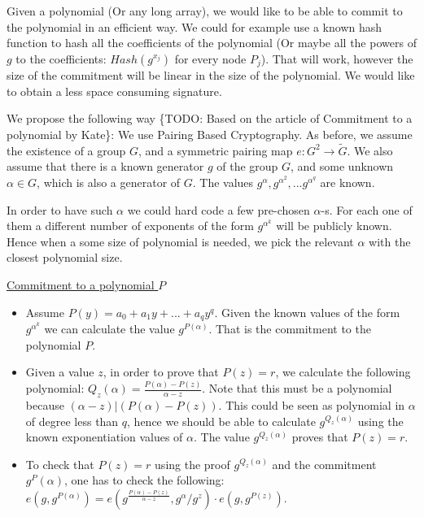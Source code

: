 Given a polynomial (Or any long array), we would like to be able to commit to
the polynomial in an efficient way. We could for example use a known hash
function to hash all the coefficients of the polynomial (Or maybe all the powers
of $g$ to the coefficients: $Hash(g^{x_j})$ for every node $P_j$). That will
work, however the size of the commitment will be linear in the size of the
polynomial. We would like to obtain a less space consuming signature.

We propose the following way \{TODO: Based on the article of Commitment to a
polynomial by Kate\}: We use Pairing Based Cryptography. As before, we assume
the existence of a group $G$, and a symmetric pairing map $e:G^2 \to \tilde{G}$.
We also assume that there is a known generator $g$ of the group $G$, and some
unknown $\alpha \in G$, which is also a generator of $G$. The values
$g^{\alpha}, g^{{\alpha}^2},...g^{{\alpha}^q}$ are known.

In order to have such $\alpha$ we could hard code a few pre-chosen $\alpha$-s.
For each one of them a different number of exponents of the form
$g^{{\alpha}^k}$ will be publicly known. Hence when a some size of polynomial is
needed, we pick the relevant $\alpha$ with the closest polynomial size.

\uline{Commitment to a polynomial $P$}
\begin{itemize}
  \item Assume $P(y) = a_0 + {a_1}y + ... + {a_q}y^q$. Given the known values of
    the form $g^{{\alpha}^k}$ we can calculate the value $g^{P(\alpha)}$. That
    is the commitment to the polynomial $P$.

  \item Given a value $z$, in order to prove that $P(z) = r$, we calculate the
    following polynomial: $Q_z(\alpha) = \frac{P(\alpha) - P(z)}{\alpha - z}$.
    Note that this must be a polynomial because $(\alpha - z) | (P(\alpha) -
    P(z))$. This could be seen as polynomial in $\alpha$ of degree less than
    $q$, hence we should be able to calculate $g^{Q_z(\alpha)}$ using the known
    exponentiation values of $\alpha$. The value $g^{Q_z(\alpha)}$ proves that
    $P(z) = r$.

  \item To check that $P(z) = r$ using the proof $g^{Q_z(\alpha)}$ and the
    commitment $g^P(\alpha)$, one has to check the following:
    $e(g,g^{P(\alpha)}) = e(g^{\frac{P(\alpha) - P(z)}{\alpha - z}},g^{\alpha} /
    g^z) \cdot e(g,g^{P(z)})$.

\end{itemize}

